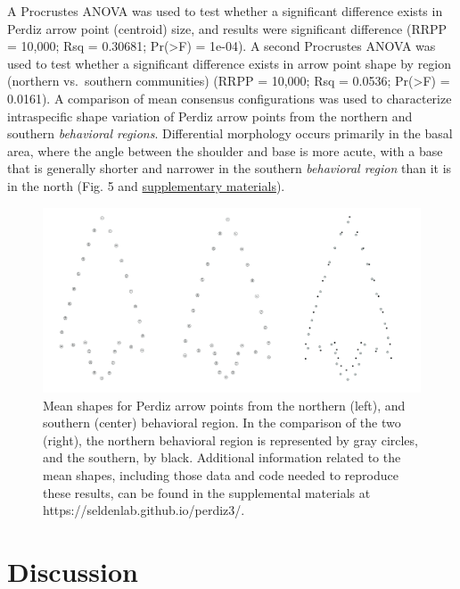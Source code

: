 \documentclass[smallextended]{svjour3}       %
\begin{document}
A Procrustes ANOVA was used to test whether a significant difference
exists in Perdiz arrow point (centroid) size, and results were
significant difference (RRPP = 10,000; Rsq = 0.30681; Pr(\textgreater F)
= 1e-04). A second Procrustes ANOVA was used to test whether a
significant difference exists in arrow point shape by region (northern
vs.~southern communities) (RRPP = 10,000; Rsq = 0.0536;
Pr(\textgreater F) = 0.0161). A comparison of mean consensus
configurations was used to characterize intraspecific shape variation of
Perdiz arrow points from the northern and southern \emph{behavioral
regions}. Differential morphology occurs primarily in the basal area,
where the angle between the shoulder and base is more acute, with a base
that is generally shorter and narrower in the southern \emph{behavioral
region} than it is in the north (Fig. 5 and
\href{https://seldenlab.github.io/perdiz3/}{supplementary materials}).

\begin{figure}
\includegraphics[width=1\linewidth]{ms-figs/figure5} \caption{Mean shapes for Perdiz arrow points from the northern (left), and southern (center) behavioral region. In the comparison of the two (right), the northern behavioral region is represented by gray circles, and the southern, by black. Additional information related to the mean shapes, including those data and code needed to reproduce these results, can be found in the supplemental materials at https://seldenlab.github.io/perdiz3/.}\label{fig:fig5}
\end{figure}

\hypertarget{discussion}{%
\section{Discussion}\label{discussion}}
\end{document}
